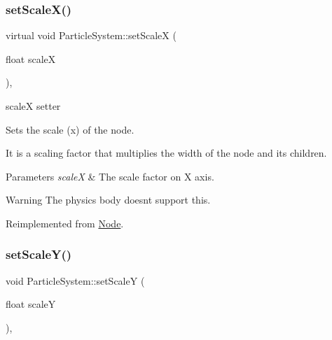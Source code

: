 \mbox{\label{classParticleSystem_a48e07e72b7694502ed1375c1df37f9fe}} 
\subsubsection{\texorpdfstring{set\+Scale\+X()}{setScaleX()}\hspace{0.1cm}{\footnotesize\ttfamily [2/2]}}
{\footnotesize\ttfamily virtual void Particle\+System\+::set\+ScaleX (\begin{DoxyParamCaption}\item[{float}]{scaleX }\end{DoxyParamCaption})\hspace{0.3cm}{\ttfamily [override]}, {\ttfamily [virtual]}}



scaleX setter 

Sets the scale (x) of the node.

It is a scaling factor that multiplies the width of the node and its children.


\begin{DoxyParams}{Parameters}
{\em scaleX} & The scale factor on X axis.\\
\hline
\end{DoxyParams}
\begin{DoxyWarning}{Warning}
The physics body doesn\textquotesingle{}t support this. 
\end{DoxyWarning}


Reimplemented from \hyperlink{classNode_acf7f04074f7f49972e152788c090b877}{Node}.

\mbox{\label{classParticleSystem_a3b3ba015dde4abcf804692cacef4f575}} 
\subsubsection{\texorpdfstring{set\+Scale\+Y()}{setScaleY()}\hspace{0.1cm}{\footnotesize\ttfamily [1/2]}}
{\footnotesize\ttfamily void Particle\+System\+::set\+ScaleY (\begin{DoxyParamCaption}\item[{float}]{scaleY }\end{DoxyParamCaption})\hspace{0.3cm}{\ttfamily [override]}, {\ttfamily [virtual]}}



